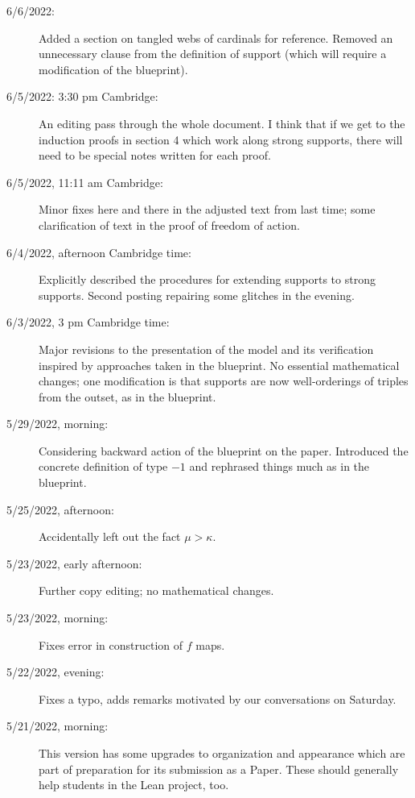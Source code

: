 \documentclass[112pt]{article}
\begin{document}
\begin{description}
\item[6/6/2022:]  Added a section on tangled webs of cardinals for reference.  Removed an unnecessary clause from the definition of support (which will require a modification of the blueprint).

\item[6/5/2022:  3:30 pm Cambridge:]  An editing pass through the whole document.  I think that if we get to the induction proofs in section 4 which work along strong supports, there will need to be special notes written for each proof.

\item[6/5/2022, 11:11 am Cambridge:]  Minor fixes here and there in the adjusted text from last time;  some clarification of text in the proof of freedom of action.

\item[6/4/2022, afternoon Cambridge time:]  Explicitly described the procedures for extending supports to strong supports.  Second posting repairing some glitches in the evening.

\item[6/3/2022, 3 pm Cambridge time:]  Major revisions to the presentation of the model and its verification inspired by approaches taken in the blueprint.  No essential mathematical changes;  one modification is that supports are now well-orderings of triples from the outset, as in the blueprint.

\item[5/29/2022, morning:]  Considering backward action of the blueprint on the paper.  Introduced the concrete definition of type $-1$ and rephrased things much as in the blueprint.

\item[5/25/2022, afternoon:]  Accidentally left out the fact $\mu>\kappa$.

\item[5/23/2022, early afternoon:]  Further copy editing;  no mathematical changes.

\item[5/23/2022, morning:]  Fixes error in construction of $f$ maps.

\item[5/22/2022, evening:]  Fixes a typo, adds remarks motivated by our conversations on Saturday.

\item[5/21/2022, morning:]  This version has some upgrades to organization and appearance which are part of preparation for its submission as a Paper.  These should generally help students in the Lean project, too.


\end{description}
\end{document}
